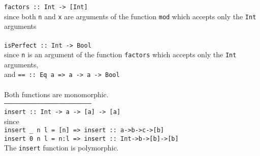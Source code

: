 \texttt{factors :: Int -> [Int]}\\
since both \texttt{n} and \texttt{x} are arguments of the function \texttt{mod} which accepts only the \texttt{Int} arguments\\
\\
\texttt{isPerfect :: Int -> Bool}\\
since \texttt{n} is an argument of the function \texttt{factors} which accepts only the \texttt{Int} arguments,\\
and \texttt{== :: Eq a => a -> a -> Bool}\\
\\
Both functions are monomorphic.\\
\texttt{-----------------------------------------------------------------------}\\
\texttt{insert :: Int -> a -> [a] -> [a]}\\
since\\
\texttt{insert \_ n l = [n] => insert :: a->b->c->[b]}\\
\texttt{insert 0 n l = n:l => insert :: Int->b->[b]->[b]}\\
The \texttt{insert} function is polymorphic.